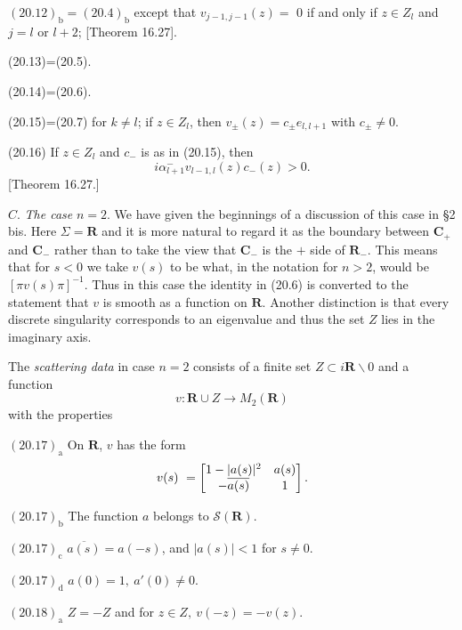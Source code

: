 \documentclass{surv-l}
\theoremstyle{plain}
\theoremstyle{definition}
\numberwithin{equation}{chapter}
\begin{document}
$\mathrm{(20.12)_{b}=(20.4)_{b}}$ except that $v_{j-1,j-1}(z)=$ 0 if and only if $z\in Z_{l}$ and $j=l$ or $l+2$; [Theorem 16.27].

(20.13)=(20.5).

(20.14)=(20.6).

(20.15)=(20.7) for $k\neq l$; if $z\in Z_{l}$, then $v_{\pm}(z)=c_{\pm} e_{l,l+1}$ with $c_{\pm}\neq 0$.

(20.16) If $z\in Z_{l}$ and $c_{-}$ is as in (20.15), then
\begin{equation*}
i\alpha_{l+1}^{-}v_{l-1,l}(z)c_{-}(z)>0.
\end{equation*}
[Theorem 16.27.]

$C$. \emph{The case} $n=2$. We have given the beginnings of a discussion of this case in \S 2 bis. Here $\Sigma=\mathbf{R}$ and it is more natural to regard it as the boundary between $\mathbf{C}_{+}$ and $\mathbf{C}_{-}$ rather than to take the view that $\mathbf{C}_{-}$ is the $+$ side of $\mathbf{R}_{-}$. This means that for $s<0$ we take $v(s)$ to be what, in the notation for $n>2$, would be $[\pi v(s)\pi]^{-1}$. Thus in this case the identity in (20.6) is converted to the statement that $v$ is smooth as a function on $\mathbf{R}$. Another distinction is that every discrete singularity corresponds to an eigenvalue and thus the set $Z$ lies in the imaginary axis.

The \emph{scattering data} in case $n=2$ consists of a finite set $Z\subset i \mathbf{R}\backslash 0$ and a function
\begin{equation*}
v:\mathbf{R}\cup Z\rightarrow M_{2}(\mathbf{R})
\end{equation*}
with the properties

$\mathrm{(20.17)_{a}}$ On $\mathbf{R}$, $v$ has the form
\begin{equation*}
v(s)\ =\left[\begin{array}{@{}cc@{}}
1-|a(s)|^{2} & a(s)\\
-\overline{a(s)} & 1
\end{array}\right].
\end{equation*}

$\mathrm{(20.17)_{b}}$ The function $a$ belongs to $\mathscr{S}(\mathbf{R})$.

$\mathrm{(20.17)_{c}}$ $\overline{a(s)}=a(-s)$, and $|a(s)|<1$ for $s\neq 0$.

$\mathrm{(20.17)_{d}}$  $a(0)=1,\ a'(0)\neq 0$.

$\mathrm{(20.18)_{a}}$ $Z=-Z$ and for $z\in Z,\ v(-z)=-v(z)$.
\end{document}
